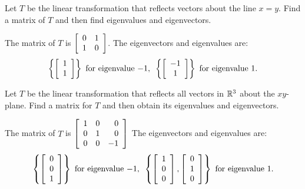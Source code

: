 \documentclass{ximera}
\begin{document}
\begin{exercise}
  Let $T$ be the linear transformation that reflects vectors about the
  line $x=y$. Find a matrix of $T$ and then find eigenvalues and
  eigenvectors.
  \begin{solution}
    The matrix of $T$ is $\startmat{rr}
      0 & 1 \\
      1 & 0
    \stopmat$. The eigenvectors and eigenvalues are:
    \begin{equation*}
      \set{\startmat{c}
          1 \\
          1
        \stopmat} ~\mbox{for eigenvalue}~ {-1},
      \quad\set{\startmat{c}
          -1 \\
          1
        \stopmat} ~\mbox{for eigenvalue}~ {1}.
    \end{equation*}
  \end{solution}
\end{exercise}

\begin{exercise}
  Let $T$ be the linear transformation that reflects all vectors in
  $\R^3$ about the $xy$-plane. Find a matrix for $T$ and then
  obtain its eigenvalues and eigenvectors.
  \begin{solution}
    The matrix of $T$ is $\startmat{rrr}
      1 & 0 & 0 \\
      0 & 1 & 0 \\
      0 & 0 & -1
    \stopmat$
    The eigenvectors and eigenvalues are:
    \begin{equation*}
      \set{\startmat{c}
          0 \\
          0 \\
          1
        \stopmat} ~\mbox{for eigenvalue $-1$},
      \quad\set{\startmat{c}
          1 \\
          0 \\
          0
        \stopmat,
        \startmat{c}
          0 \\
          1 \\
          0
        \stopmat} ~\mbox{for eigenvalue $1$}.
    \end{equation*}
  \end{solution}
\end{exercise}
\end{document}
